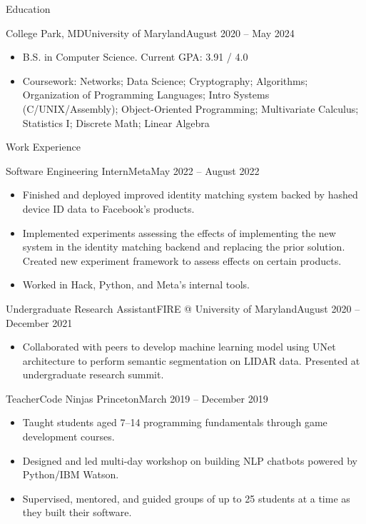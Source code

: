 \documentclass[]{mcdowellcv}
\begin{document}
	\makeheader
	
	\begin{cvsection}{Education}
		\begin{cvsubsection}{College Park, MD}{University of Maryland}{August 2020 -- May 2024}
			\begin{itemize}
				\item B.S. in Computer Science. Current GPA: 3.91 / 4.0
				\item Coursework: Networks; Data Science; Cryptography; Algorithms; Organization of Programming Languages; Intro
					  Systems (C/UNIX/Assembly); Object-Oriented Programming; Multivariate Calculus; Statistics I;
					  Discrete Math; Linear Algebra
			\end{itemize}
		\end{cvsubsection}
	\end{cvsection}

	\begin{cvsection}{Work Experience}
		\begin{cvsubsection}{Software Engineering Intern}{Meta}{May 2022 -- August 2022}
			\begin{itemize}
				\item Finished and deployed improved identity matching system backed by hashed device ID data to
				      Facebook's products.
				\item Implemented experiments assessing the effects of implementing the new system in the identity
					  matching backend and replacing the prior solution. Created new experiment framework to assess
					  effects on certain products.
				\item Worked in Hack, Python, and Meta's internal tools.
			\end{itemize}
		\end{cvsubsection}
		\begin{cvsubsection}{Undergraduate Research Assistant}{FIRE @ University of Maryland}{August 2020 -- December 2021}
			\vspace{0.8em}
			\begin{itemize}
				\item Collaborated with peers to develop machine learning model using UNet architecture to perform
				      semantic segmentation on LIDAR data. Presented at undergraduate research summit.
			\end{itemize}
		\end{cvsubsection}
		\begin{cvsubsection}{Teacher}{Code Ninjas Princeton}{March 2019 -- December 2019}
			\begin{itemize}
				\item Taught students aged 7--14 programming fundamentals through
					  game development courses.
				\item Designed and led multi-day workshop on building NLP chatbots
				      powered by Python/IBM Watson.
				\item Supervised, mentored, and guided groups of up to 25 students at a time as they 
				      built their software.
			\end{itemize}
		\end{cvsubsection}
	\end{cvsection}
\end{document}
